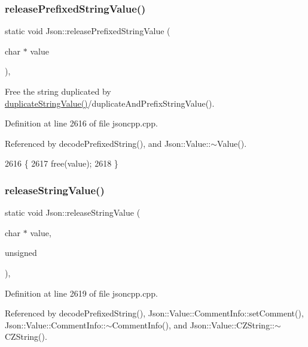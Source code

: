 \subsubsection{\texorpdfstring{release\+Prefixed\+String\+Value()}{releasePrefixedStringValue()}}
{\footnotesize\ttfamily static void Json\+::release\+Prefixed\+String\+Value (\begin{DoxyParamCaption}\item[{char $\ast$}]{value }\end{DoxyParamCaption})\hspace{0.3cm}{\ttfamily [inline]}, {\ttfamily [static]}}

Free the string duplicated by \hyperlink{namespace_json_a678ac3a60cd70ec0fb4c9abfd40eb0c4}{duplicate\+String\+Value()}/duplicate\+And\+Prefix\+String\+Value(). 

Definition at line 2616 of file jsoncpp.\+cpp.



Referenced by decode\+Prefixed\+String(), and Json\+::\+Value\+::$\sim$\+Value().


\begin{DoxyCode}
2616                                                            \{
2617   free(value);
2618 \}
\end{DoxyCode}
\mbox{\label{namespace_json_a3e0d81d514d0e8bddf33b08074214abd}} 
\subsubsection{\texorpdfstring{release\+String\+Value()}{releaseStringValue()}}
{\footnotesize\ttfamily static void Json\+::release\+String\+Value (\begin{DoxyParamCaption}\item[{char $\ast$}]{value,  }\item[{unsigned}]{ }\end{DoxyParamCaption})\hspace{0.3cm}{\ttfamily [inline]}, {\ttfamily [static]}}



Definition at line 2619 of file jsoncpp.\+cpp.



Referenced by decode\+Prefixed\+String(), Json\+::\+Value\+::\+Comment\+Info\+::set\+Comment(), Json\+::\+Value\+::\+Comment\+Info\+::$\sim$\+Comment\+Info(), and Json\+::\+Value\+::\+C\+Z\+String\+::$\sim$\+C\+Z\+String().


